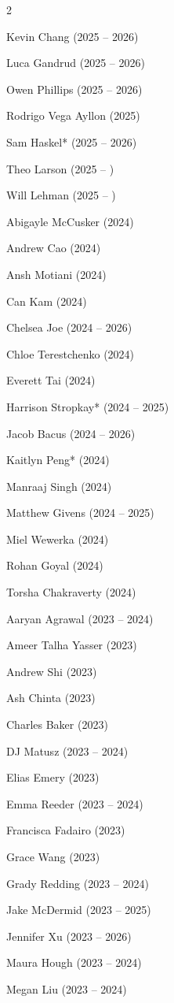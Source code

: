 \documentclass[11pt, a4paper]{article} %
\begin{document}
\begin{multicols}{2}
\begin{etaremune}
  \item Kevin Chang (2025 -- 2026)
  \item Luca Gandrud (2025 -- 2026)
  \item Owen Phillips (2025 -- 2026)
  \item Rodrigo Vega Ayllon (2025)
  \item Sam Haskel* (2025 -- 2026)
  \item Theo Larson (2025 -- )
  \item Will Lehman (2025 -- )
  \item Abigayle McCusker (2024)
  \item Andrew Cao (2024)
  \item Ansh Motiani (2024)
  \item Can Kam (2024)
  \item Chelsea Joe (2024 -- 2026)
  \item Chloe Terestchenko (2024)
  \item Everett Tai (2024)
  \item Harrison Stropkay* (2024 -- 2025)
  \item Jacob Bacus (2024 -- 2026)
  \item Kaitlyn Peng* (2024)
  \item Manraaj Singh (2024)
  \item Matthew Givens (2024 -- 2025)
  \item Miel Wewerka (2024)
  \item Rohan Goyal (2024)
  \item Torsha Chakraverty (2024)
  \item Aaryan Agrawal (2023 -- 2024)
  \item Ameer Talha Yasser (2023)
  \item Andrew Shi (2023)
  \item Ash Chinta (2023)
  \item Charles Baker (2023)
  \item DJ Matusz (2023 -- 2024)
  \item Elias Emery (2023)
  \item Emma Reeder (2023 -- 2024)
  \item Francisca Fadairo (2023)
  \item Grace Wang (2023)
  \item Grady Redding (2023 -- 2024)
  \item Jake McDermid (2023 -- 2025)
  \item Jennifer Xu (2023 -- 2026)
  \item Maura Hough (2023 -- 2024)
  \item Megan Liu (2023 -- 2024)

\end{etaremune}
\end{multicols}
\end{document}
